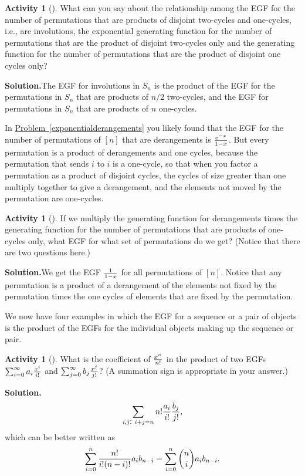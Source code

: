 \documentclass[10pt,]{book}
\theoremstyle{plain}
\theoremstyle{definition}
\newtheorem{activity}[project]{Activity}
\numberwithin{equation}{chapter}
\begin{document}
\begin{activity}[]\label{x2cyclesand1cycles}
What can you say about the relationship among the EGF for the number of permutations that are products of disjoint two-cycles and one-cycles, i.e., are involutions, the exponential generating function for the number of permutations that are the product of disjoint two-cycles only and the generating function for the number of permutations that are the product of disjoint one cycles only?%
\par\medskip\noindent%
\textbf{Solution.}\quad The EGF for involutions in \(S_n\) is the product of the EGF for the permutations in \(S_n\) that are products of \(n/2\) two-cycles, and the EGF for permutations in \(S_n\) that are products of \(n\) one-cycles.%
\end{activity}
In \hyperref[exponentialderangements]{Problem~\ref{exponentialderangements}} you likely found that the EGF for the number of permutations of \([n]\) that are derangements is \(e^{-x}\over 1-x\). But every permutation is a product of derangements and one cycles, because the permutation that sends \(i\) to \(i\) is a one-cycle, so that when you factor a permutation as a product of disjoint cycles, the cycles of size greater than one multiply together to give a derangement, and the elements not moved by the permutation are one-cycles.%
\begin{activity}[]\label{derangementsand1cycles}
If we multiply the generating function for derangements times the generating function for the number of permutations that are products of one-cycles only, what EGF for what set of permutations do we get? (Notice that there are two questions here.)%
\par\medskip\noindent%
\textbf{Solution.}\quad We get the EGF \(1\over 1-x\) for all permutations of \([n]\). Notice that any permutation is a product of a derangement of the elements not fixed by the permutation times the one cycles of elements that are fixed by the permutation.%
\end{activity}
We now have four examples in which the EGF for a sequence or a pair of objects is the product of the EGFs for the individual objects making up the sequence or pair.%
\begin{activity}[]\label{exponentialpp1}
What is the coefficient of \(x^n\over n!\) in the product of two EGFs \(\sum_{i=0}^\infty a_i{x^i\over i!}\) and \(\sum_{j=0}^\infty
b_j{x^j\over j!}\)? (A summation sign is appropriate in your answer.)%
\par\medskip\noindent%
\textbf{Solution.}\quad %
\begin{equation*}
\sum_{i,j\mbox{:\ } 
i+j=n} n!{a_i\over i!}{b_j \over j!},
\end{equation*}
which can be better written as%
\begin{equation*}
\sum_{i=0}^n{n!\over i!(n-i)!} a_i
b_{n-i}=\sum_{i=0}^n{n\choose i} a_i b_{n-i}.
\end{equation*}
%
\end{activity}
\end{document}
